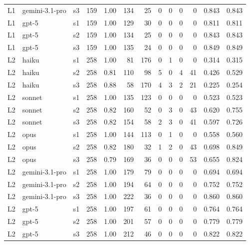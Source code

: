 \documentclass[10pt]{article} %
\begin{document}
\begin{table}[t]
\begin{center}
\begin{tabular}{lllrrrrrrrrrr}
        L1 & gemini-3.1-pro & s3 & 159 & 1.00 & 134 & 25 & 0 & 0 & 0 & 0 & 0.843 & 0.843 \\
        L1 & gpt-5 & s1 & 159 & 1.00 & 129 & 30 & 0 & 0 & 0 & 0 & 0.811 & 0.811 \\
        L1 & gpt-5 & s2 & 159 & 1.00 & 134 & 25 & 0 & 0 & 0 & 0 & 0.843 & 0.843 \\
        L1 & gpt-5 & s3 & 159 & 1.00 & 135 & 24 & 0 & 0 & 0 & 0 & 0.849 & 0.849 \\
        L2 & haiku & s1 & 258 & 1.00 & 81 & 176 & 0 & 1 & 0 & 0 & 0.314 & 0.315 \\
        L2 & haiku & s2 & 258 & 0.81 & 110 & 98 & 5 & 0 & 4 & 41 & 0.426 & 0.529 \\
        L2 & haiku & s3 & 258 & 0.88 & 58 & 170 & 4 & 3 & 2 & 21 & 0.225 & 0.254 \\
        L2 & sonnet & s1 & 258 & 1.00 & 135 & 123 & 0 & 0 & 0 & 0 & 0.523 & 0.523 \\
        L2 & sonnet & s2 & 258 & 0.82 & 160 & 52 & 0 & 3 & 0 & 43 & 0.620 & 0.755 \\
        L2 & sonnet & s3 & 258 & 0.82 & 154 & 58 & 2 & 3 & 0 & 41 & 0.597 & 0.726 \\
        L2 & opus & s1 & 258 & 1.00 & 144 & 113 & 0 & 1 & 0 & 0 & 0.558 & 0.560 \\
        L2 & opus & s2 & 258 & 0.82 & 180 & 32 & 1 & 2 & 0 & 43 & 0.698 & 0.849 \\
        L2 & opus & s3 & 258 & 0.79 & 169 & 36 & 0 & 0 & 0 & 53 & 0.655 & 0.824 \\
        L2 & gemini-3.1-pro & s1 & 258 & 1.00 & 179 & 79 & 0 & 0 & 0 & 0 & 0.694 & 0.694 \\
        L2 & gemini-3.1-pro & s2 & 258 & 1.00 & 194 & 64 & 0 & 0 & 0 & 0 & 0.752 & 0.752 \\
        L2 & gemini-3.1-pro & s3 & 258 & 1.00 & 222 & 36 & 0 & 0 & 0 & 0 & 0.860 & 0.860 \\
        L2 & gpt-5 & s1 & 258 & 1.00 & 197 & 61 & 0 & 0 & 0 & 0 & 0.764 & 0.764 \\
        L2 & gpt-5 & s2 & 258 & 1.00 & 201 & 57 & 0 & 0 & 0 & 0 & 0.779 & 0.779 \\
        L2 & gpt-5 & s3 & 258 & 1.00 & 212 & 46 & 0 & 0 & 0 & 0 & 0.822 & 0.822 \\
    \end{tabular}
    \end{center}
    \end{table}

\FloatBarrier
\end{document}
